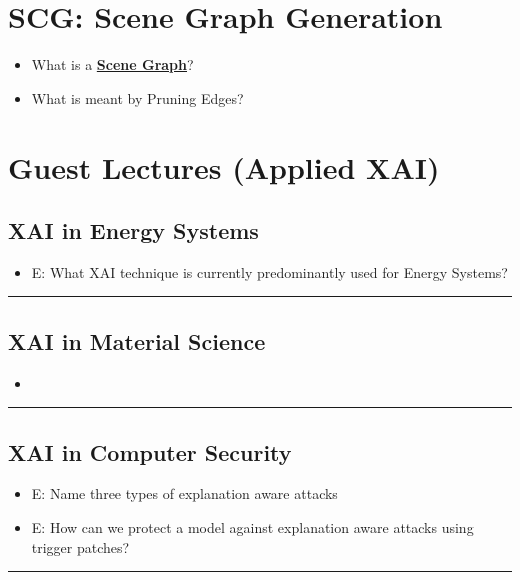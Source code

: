 \documentclass{report}
\newcommand{\asw}[2][teal]{}
\renewcommand{\asw}[2][teal]{\textcolor{#1}{#2}}
\begin{document}
	\section{SCG: Scene Graph Generation}
	
	\begin{itemize}
	\item What is a \textbf{\underline{Scene Graph}}?
	\asw{\newline }
	\item What is meant by Pruning Edges?
	\asw{\newline }
	\end{itemize}
	\newpage

	\section{Guest Lectures (Applied XAI)}
	
		\subsection{XAI in Energy Systems}
		
		\begin{itemize}
		\item E: What XAI technique is currently predominantly used for Energy Systems?
		\asw{\newline }
		\end{itemize}
		\hrule 
	
		\subsection{XAI in Material Science}
		
		\begin{itemize}
		\item 
		\end{itemize}
		\hrule 
	
		\subsection{XAI in Computer Security}
		
		\begin{itemize}
		\item E: Name three types of explanation aware attacks
		\asw{\newline }
		\item E: How can we protect a model against explanation aware attacks using trigger patches?
		\asw{\newline }
		\end{itemize}
		\hrule 
	
\end{document}
